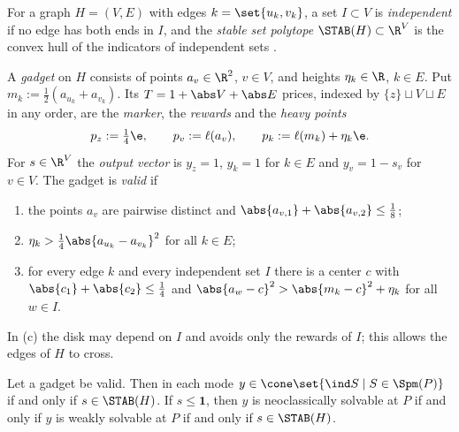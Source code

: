For a graph $H=(V,E)$ with edges $k=\set{u_k,v_k}$, a set $I\subset V$ is \emph{independent} if no edge has both ends in $I$, and the \emph{stable set polytope} $\STAB(H)\subset\R^V$ is the convex hull of the indicators of independent sets \citep[Ch.~9]{GrotschelLovaszSchrijver1988}.

\begin{definition}[gadget]\label{def:gadget}
A \emph{gadget} on $H$ consists of points $a_v\in\R^2$, $v\in V$, and heights $\eta_k\in\R$, $k\in E$. Put $m_k:=\frac12(a_{u_k}+a_{v_k})$. Its $T=1+\abs V+\abs E$ prices, indexed by $\{z\}\sqcup V\sqcup E$ in any order, are the \emph{marker}, the \emph{rewards} and the \emph{heavy points}
\[
p_z:=\tfrac14\e,\qquad p_v:=\ell(a_v),\qquad p_k:=\ell(m_k)+\eta_k\e.
\]
For $s\in\R^V$ the \emph{output vector} is $y_z=1$, $y_k=1$ for $k\in E$ and $y_v=1-s_v$ for $v\in V$. The gadget is \emph{valid} if
\begin{enumerate}[label=(\alph*)]
\item the points $a_v$ are pairwise distinct and $\abs{a_{v,1}}+\abs{a_{v,2}}\le\frac18$;
\item $\eta_k>\frac14\abs{a_{u_k}-a_{v_k}}^2$ for all $k\in E$;
\item for every edge $k$ and every independent set $I$ there is a center $c$ with $\abs{c_1}+\abs{c_2}\le\frac14$ and $\abs{a_w-c}^2>\abs{m_k-c}^2+\eta_k$ for all $w\in I$.
\end{enumerate}
\end{definition}

In (c) the disk may depend on $I$ and avoids only the rewards of $I$; this allows the edges of $H$ to cross.

\begin{theorem}[gadget]\label{thm:gadget}
Let a gadget be valid. Then in each mode $y\in\cone\set{\ind S\mid S\in\Spm(P)}$ if and only if $s\in\STAB(H)$. If $s\le\mathbf 1$, then $y$ is neoclassically solvable at $P$ if and only if $y$ is weakly solvable at $P$ if and only if $s\in\STAB(H)$.
\end{theorem}

